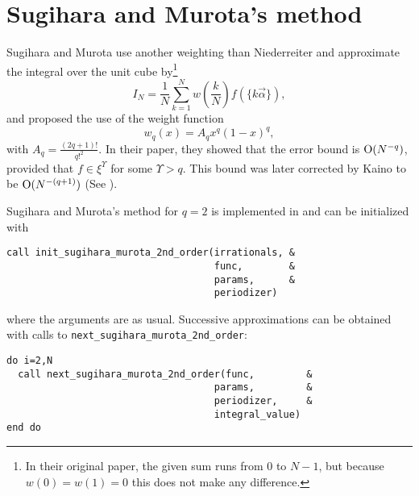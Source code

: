 \section{Sugihara and Murota's method}

Sugihara and Murota \cite{sugihara82murota} use another weighting than
Niederreiter and approximate the integral over the unit cube 
by\footnote{In their original paper, the given sum runs from 0 to $N-1$,
but because $w(0)=w(1)=0$ this does not make any difference.}
%
\begin{equation} \label{eq:sugihara_murota_approximation}
I_N = \frac{1}{N} \sum_{k=1}^{N}w\left(\frac{k}{N}\right)f(\{k\vec{\alpha}\}),
\end{equation}
%
and proposed the use of the weight function
\[
w_q(x) = A_qx^q(1-x)^q,
\]
with $A_q = \frac{(2q+1)!}{q!^2}$.  In their paper, they showed that the error
bound is $\operatorname{O}(N^{-q})$, provided that $f \in \xi^{\Upsilon}$ for some $\Upsilon > q$.  This bound was later corrected by Kaino to be $\operatorname{O}(N^{-(q+1)})$ (See \cite{kaino02}).

Sugihara and Murota's method for $q=2$ is implemented in \qmcpack and can be
initialized with
\begin{lstlisting}
call init_sugihara_murota_2nd_order(irrationals, &
                                    func,        &
                                    params,      &
                                    periodizer)
\end{lstlisting}
where the arguments are as usual.  Successive approximations can be obtained
with calls to \verb!next_sugihara_murota_2nd_order!:
\begin{lstlisting}
do i=2,N
  call next_sugihara_murota_2nd_order(func,         &
                                    params,         &
                                    periodizer,     &
                                    integral_value)
end do
\end{lstlisting}
